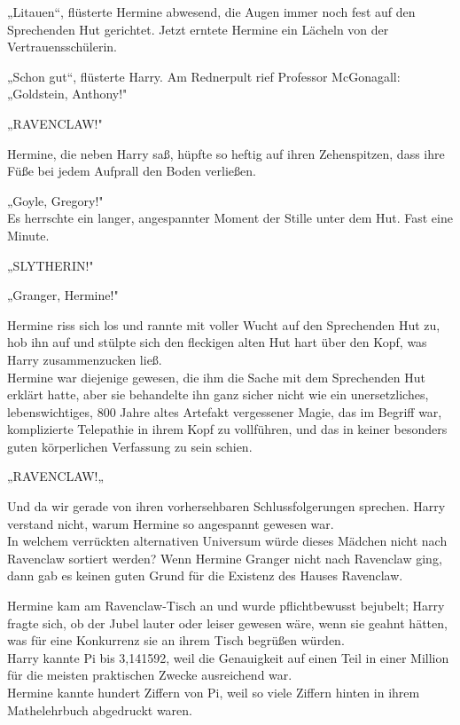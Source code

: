 {„Litauen“, flüsterte Hermine abwesend, die Augen immer noch fest auf den Sprechenden Hut gerichtet. Jetzt erntete Hermine ein Lächeln von der Vertrauensschülerin.

„Schon gut“, flüsterte Harry. Am Rednerpult rief Professor McGonagall:\\ „Goldstein, Anthony!"

„RAVENCLAW!"

Hermine, die neben Harry saß, hüpfte so heftig auf ihren Zehenspitzen, dass ihre Füße bei jedem Aufprall den Boden verließen.

„Goyle, Gregory!"\\ Es herrschte ein langer, angespannter Moment der Stille unter dem Hut. Fast eine Minute.

„SLYTHERIN!"

„Granger, Hermine!"

Hermine riss sich los und rannte mit voller Wucht auf den Sprechenden Hut zu, hob ihn auf und stülpte sich den fleckigen alten Hut hart über den Kopf, was Harry zusammenzucken ließ.\\ Hermine war diejenige gewesen, die ihm die Sache mit dem Sprechenden Hut erklärt hatte, aber sie behandelte ihn ganz sicher nicht wie ein unersetzliches, lebenswichtiges, 800 Jahre altes Artefakt vergessener Magie, das im Begriff war, komplizierte Telepathie in ihrem Kopf zu vollführen, und das in keiner besonders guten körperlichen Verfassung zu sein schien.

„RAVENCLAW!„

Und da wir gerade von ihren vorhersehbaren Schlussfolgerungen sprechen. Harry verstand nicht, warum Hermine so angespannt gewesen war.\\ In welchem verrückten alternativen Universum würde dieses Mädchen nicht nach Ravenclaw sortiert werden? Wenn Hermine Granger nicht nach Ravenclaw ging, dann gab es keinen guten Grund für die Existenz des Hauses Ravenclaw.

Hermine kam am Ravenclaw-Tisch an und wurde pflichtbewusst bejubelt; Harry fragte sich, ob der Jubel lauter oder leiser gewesen wäre, wenn sie geahnt hätten, was für eine Konkurrenz sie an ihrem Tisch begrüßen würden.\\ Harry kannte Pi bis 3,141592, weil die Genauigkeit auf einen Teil in einer Million für die meisten praktischen Zwecke ausreichend war.\\ Hermine kannte hundert Ziffern von Pi, weil so viele Ziffern hinten in ihrem Mathelehrbuch abgedruckt waren.

}
